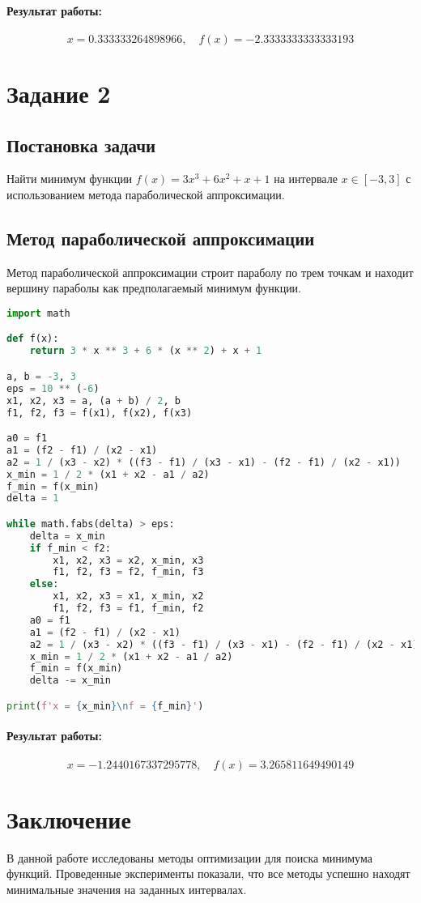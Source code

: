 \documentclass[a4paper,12pt]{article}
\begin{document}
\paragraph{Результат работы:}
\[ 
x = 0.333333264898966, \quad f(x) = -2.3333333333333193 
\]

\section*{Задание 2}
\subsection*{Постановка задачи}
Найти минимум функции \( f(x) = 3x^3 + 6x^2 + x + 1 \) на интервале \( x \in [-3, 3] \) с использованием метода параболической аппроксимации.

\subsection*{Метод параболической аппроксимации}
Метод параболической аппроксимации строит параболу по трем точкам и находит вершину параболы как предполагаемый минимум функции.

\begin{lstlisting}[language=Python, caption=Метод параболической аппроксимации]
import math

def f(x):
    return 3 * x ** 3 + 6 * (x ** 2) + x + 1

a, b = -3, 3
eps = 10 ** (-6)
x1, x2, x3 = a, (a + b) / 2, b
f1, f2, f3 = f(x1), f(x2), f(x3)

a0 = f1
a1 = (f2 - f1) / (x2 - x1)
a2 = 1 / (x3 - x2) * ((f3 - f1) / (x3 - x1) - (f2 - f1) / (x2 - x1))
x_min = 1 / 2 * (x1 + x2 - a1 / a2)
f_min = f(x_min)
delta = 1

while math.fabs(delta) > eps:
    delta = x_min
    if f_min < f2:
        x1, x2, x3 = x2, x_min, x3
        f1, f2, f3 = f2, f_min, f3
    else:
        x1, x2, x3 = x1, x_min, x2
        f1, f2, f3 = f1, f_min, f2
    a0 = f1
    a1 = (f2 - f1) / (x2 - x1)
    a2 = 1 / (x3 - x2) * ((f3 - f1) / (x3 - x1) - (f2 - f1) / (x2 - x1))
    x_min = 1 / 2 * (x1 + x2 - a1 / a2)
    f_min = f(x_min)
    delta -= x_min

print(f'x = {x_min}\nf = {f_min}')
\end{lstlisting}

\paragraph{Результат работы:}
\[ 
x = -1.2440167337295778, \quad f(x) = 3.265811649490149 
\]

\section*{Заключение}
В данной работе исследованы методы оптимизации для поиска минимума функций. Проведенные эксперименты показали, что все методы успешно находят минимальные значения на заданных интервалах.
\end{document}
